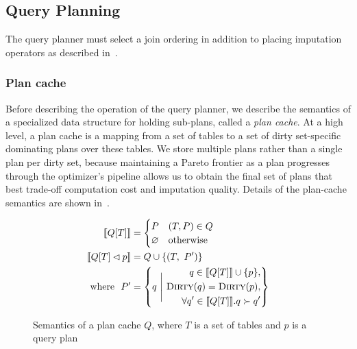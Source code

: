 \subsection{Query Planning}
\label{sec:planning}
The query planner must select a join ordering in addition to placing imputation operators as described in~.

\subsubsection{Plan cache}
Before describing the operation of the query planner, we describe the semantics of a specialized data structure for holding sub-plans, called a \emph{plan cache}.
At a high level, a plan cache is a mapping from a set of tables to a set of dirty set-specific dominating plans over these tables.
We store multiple plans rather than a single plan per dirty set, because maintaining a Pareto frontier as a plan progresses through the optimizer's pipeline
allows us to obtain the final set of plans that best trade-off computation
cost and imputation quality. Details of the plan-cache semantics are shown in~.

\begin{figure}
  \begin{align*}
    \llbracket Q[T] \rrbracket &= \begin{cases}
      P & (T, P) \in Q \\
      \varnothing & \text{otherwise} \\
    \end{cases} \\
    \llbracket Q[T] \lhd p \rrbracket &= \begin{aligned} Q \cup \{(T,\ P') \} \end{aligned}\\
    \text{ where }\ P' &= \left\{q ~\Bigg|~ \begin{aligned}
        q \in \llbracket Q[T] \rrbracket \cup \{p\}, \\
        \textsc{Dirty}(q) = \textsc{Dirty}(p),\\
        \forall q' \in \llbracket Q[T] \rrbracket.  q \succ q' 
      \end{aligned}
    \right\}
  \end{align*}
  \caption{Semantics of a plan cache $Q$, where $T$ is a set of tables and $p$ is a query plan}
  \label{fig:semantics-plan-cache}
\end{figure}

